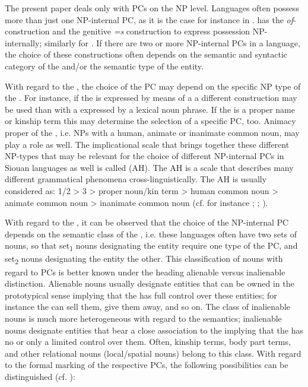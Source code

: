 \documentclass[output=paper]{LSP/langsci}
\begin{document}
The present paper deals only with PCs on the NP level. Languages often possess more than just one NP-internal PC, as it is the case for instance in .  has the \textit{of}-construction and the genitive \textit{=s} construction to express possession NP-internally; similarly for . If there are two or more NP-internal PCs in a language, the choice of these constructions often depends on the semantic and syntactic category of the  and/or the semantic type of the  entity. 

With regard to the , the choice of the PC may depend on the specific NP type of the . For instance, if the  is expressed by means of a  a different construction may be used than with a  expressed by a lexical noun phrase. If the  is a proper name or kinship term this may determine the selection of a specific PC, too. Animacy proper of the , i.e.  NPs with a human, animate or inanimate common noun, may play a role as well. The implicational scale that brings together these different NP-types that may be relevant for the choice of different NP-internal PCs in Siouan languages as well is called  (AH). The AH is a scale that describes many different grammatical phenomena cross-linguistically. The AH is usually considered as: 1/2 > 3 > proper noun/kin term > human common noun > animate common noun > inanimate common noun (cf. for instance \citealt{Dixon1979}; \citealt{Comrie1981}; \citealt{Croft2003}).

With regard to the , it can be observed that the choice of the NP-internal PC depends on the semantic class of the , i.e. these languages often have two sets of nouns, so that set\textsubscript{1} nouns designating the  entity require one type of the PC, and set\textsubscript{2} nouns designating the  entity the other. This classification of nouns with regard to PCs is better known under the heading alienable versus inalienable distinction. Alienable nouns usually designate entities that can be owned in the prototypical sense implying that the  has full control over these  entities; for instance the  can sell them, give them away, and so on. The class of inalienable nouns is much more heterogeneous with regard to the semantics; inalienable nouns designate entities that bear a close association to the  implying that the  has no or only a limited control over them. Often, kinship terms, body part terms, and other relational nouns (local/spatial nouns) belong to this class. 
With regard to the formal marking of the respective PCs, the following possibilities can be distinguished (cf. \citealt[286--290]{Dixon2010}):
\end{document}
